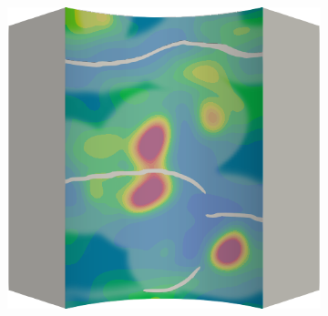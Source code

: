 \begin{figure}[!htbp]
\begin{subfigure}{0.19\textwidth}
  \end{subfigure}
  \hspace{0.06\textwidth}
  \begin{subfigure}{0.19\textwidth}
    \centering
    \includegraphics[width=\textwidth]{Chapter5/figures/spallation/ep.0030}
  \end{subfigure}
  

\end{figure}
